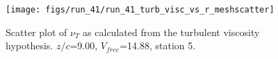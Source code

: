 \begin{figure}[H]
\centering
\texttt{[image: figs/run\_41/run\_41\_turb\_visc\_vs\_r\_meshscatter]}
\caption{Scatter plot of $\nu_T$ as calculated from the turbulent viscosity hypothesis. $z/c$=9.00, $V_{free}$=14.88, station 5.}
\label{fig:run_41_turb_visc_vs_r_meshscatter}
\end{figure}


